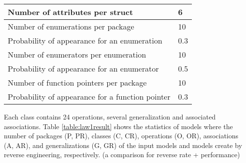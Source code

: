 \begin{table}[]
\begin{tabular}{|l|l|}
Number of attributes per struct                           & 6                \\ \hline
Number of enumerations per package                        & 10               \\ \hline
Probability of appearance for an enumeration              & 0.3              \\ \hline
Number of enumerators per enumeration                     & 10               \\ \hline
Probability of appearance for an enumerator               & 0.5              \\ \hline
Number of function pointers per package                   & 10               \\ \hline
Probability of appearance for a function pointer          & 0.3              \\ \hline
\end{tabular}
\end{table}

Each class contains 24 operations, several generalization and associated associations. Table \ref{table:law1result} shows the statistics of models where the number of packages (P, PR), classes (C, CR), operations (O, OR), associations (A, AR), and generalizations (G, GR) of the input models and models create by reverse engineering, respectively. (a comparison for reverse rate + performance)



